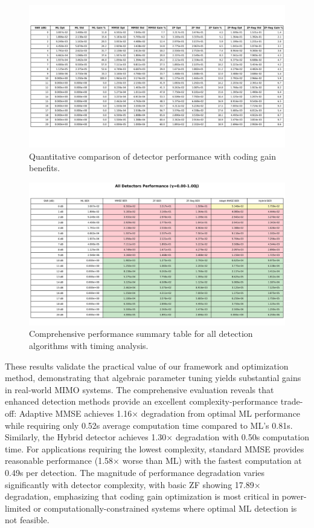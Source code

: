\begin{figure}[!t]
\centering
\includegraphics[width=0.95\columnwidth]{figures/performance_table.png}
\caption{Quantitative comparison of detector performance with coding gain benefits.}
\label{tab:performance}
\end{figure}

\begin{figure}[!t]
\centering
\includegraphics[width=0.95\columnwidth]{figures/all_detectors_table.png}
\caption{Comprehensive performance summary table for all detection algorithms with timing analysis.}
\label{tab:all_detectors}
\end{figure}

These results validate the practical value of our framework and optimization method, demonstrating that algebraic parameter tuning yields substantial gains in real-world MIMO systems. The comprehensive evaluation reveals that enhanced detection methods provide an excellent complexity-performance trade-off: Adaptive MMSE achieves 1.16× degradation from optimal ML performance while requiring only 0.52s average computation time compared to ML's 0.81s. Similarly, the Hybrid detector achieves 1.30× degradation with 0.50s computation time. For applications requiring the lowest complexity, standard MMSE provides reasonable performance (1.58× worse than ML) with the fastest computation at 0.49s per detection. The magnitude of performance degradation varies significantly with detector complexity, with basic ZF showing 17.89× degradation, emphasizing that coding gain optimization is most critical in power-limited or computationally-constrained systems where optimal ML detection is not feasible.

